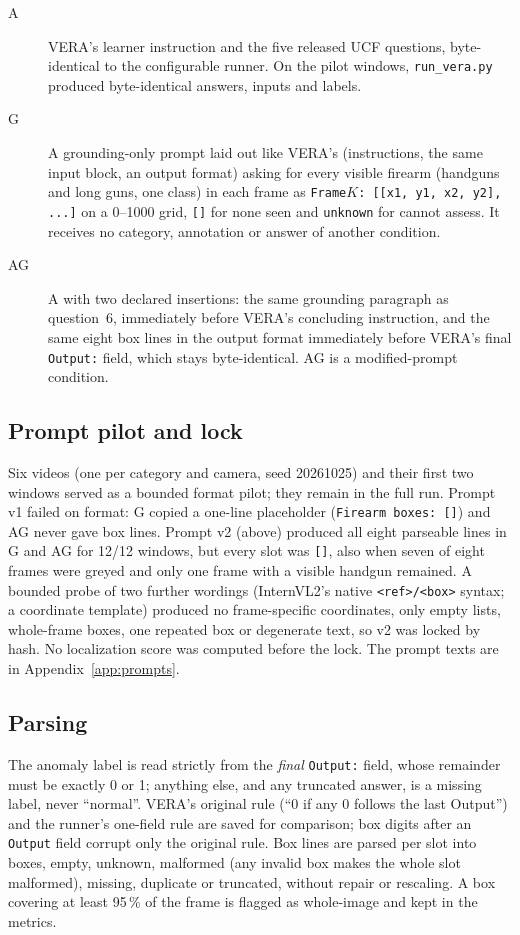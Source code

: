 \documentclass[11pt]{article}
\begin{document}
\begin{description}
\item[A] VERA's learner instruction and the five released UCF questions, byte-identical to the configurable runner. On the pilot windows, \texttt{run\_vera.py} produced byte-identical answers, inputs and labels.
\item[G] A grounding-only prompt laid out like VERA's (instructions, the same input block, an output format) asking for every visible firearm (handguns and long guns, one class) in each frame as \texttt{Frame}$K$\texttt{: [[x1, y1, x2, y2], ...]} on a 0--1000 grid, \texttt{[]} for none seen and \texttt{unknown} for cannot assess. It receives no category, annotation or answer of another condition.
\item[AG] A with two declared insertions: the same grounding paragraph as question~6, immediately before VERA's concluding instruction, and the same eight box lines in the output format immediately before VERA's final \texttt{Output:} field, which stays byte-identical. AG is a modified-prompt condition.
\end{description}

\subsection{Prompt pilot and lock}\label{sec:prompts}
Six videos (one per category and camera, seed 20261025) and their first two windows served as a bounded format pilot; they remain in the full run. Prompt v1 failed on format: G copied a one-line placeholder (\texttt{Firearm boxes: []}) and AG never gave box lines. Prompt v2 (above) produced all eight parseable lines in G and AG for 12/12 windows, but every slot was \texttt{[]}, also when seven of eight frames were greyed and only one frame with a visible handgun remained. A bounded probe of two further wordings (InternVL2's native \texttt{<ref>/<box>} syntax; a coordinate template) produced no frame-specific coordinates, only empty lists, whole-frame boxes, one repeated box or degenerate text, so v2 was locked by hash. No localization score was computed before the lock. The prompt texts are in Appendix~\ref{app:prompts}.

\subsection{Parsing}
The anomaly label is read strictly from the \emph{final} \texttt{Output:} field, whose remainder must be exactly 0 or 1; anything else, and any truncated answer, is a missing label, never ``normal''. VERA's original rule (``0 if any 0 follows the last Output'') and the runner's one-field rule are saved for comparison; box digits after an \texttt{Output} field corrupt only the original rule. Box lines are parsed per slot into boxes, empty, unknown, malformed (any invalid box makes the whole slot malformed), missing, duplicate or truncated, without repair or rescaling. A box covering at least 95\,\% of the frame is flagged as whole-image and kept in the metrics.
\end{document}
